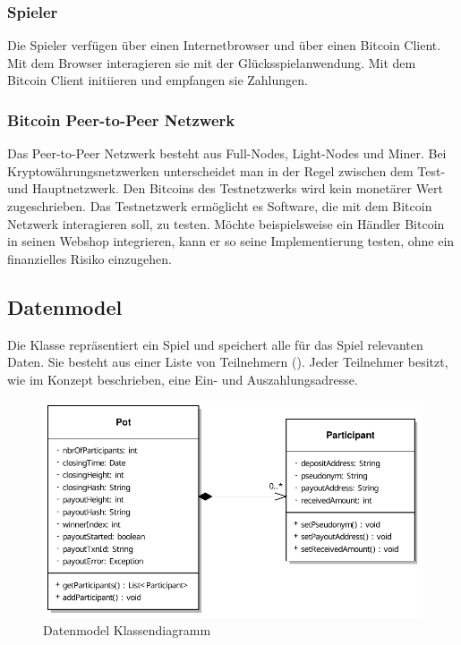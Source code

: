 \subsubsection{Spieler}
Die Spieler verfügen über einen Internetbrowser und über einen Bitcoin Client.
Mit dem Browser interagieren sie mit der Glücksspielanwendung. Mit dem Bitcoin Client initiieren und empfangen sie Zahlungen.
\subsubsection{Bitcoin Peer-to-Peer Netzwerk}
Das Peer-to-Peer Netzwerk besteht aus Full-Nodes, Light-Nodes und Miner. Bei Kryptowährungsnetzwerken unterscheidet man in der Regel zwischen dem Test- und Hauptnetzwerk. Den Bitcoins des Testnetzwerks wird kein monetärer Wert zugeschrieben. Das Testnetzwerk ermöglicht es Software, die mit dem Bitcoin Netzwerk interagieren soll, zu testen. Möchte beispielsweise ein Händler Bitcoin in seinen Webshop integrieren, kann er so seine Implementierung testen, ohne ein finanzielles Risiko einzugehen. 

\subsection{Datenmodel}
Die Klasse  repräsentiert ein Spiel und speichert alle für das Spiel relevanten Daten. Sie besteht aus einer Liste von Teilnehmern (). Jeder Teilnehmer besitzt, wie im Konzept beschrieben, eine Ein- und Auszahlungsadresse.
\begin{figure}[H]
\centering
\includegraphics[width=1\linewidth]{Figures/umsetzung_btc/btc_datamodel}
\decoRule
\caption{Datenmodel Klassendiagramm}
\label{fig:btc_datenmodell}
\end{figure}


